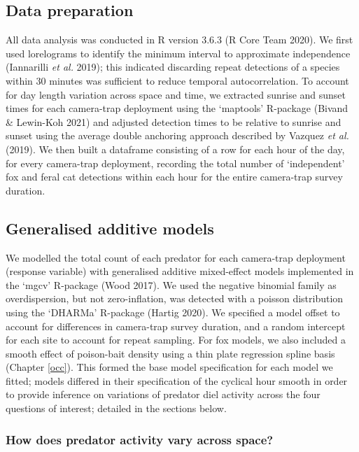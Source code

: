 \documentclass[11pt,a4paper,titlepage,twoside,openright]{style/unimelbthesis}
\begin{document}
\begin{mainmatter}
\hypertarget{data-preparation}{%
\subsection{Data preparation}\label{data-preparation}}

All data analysis was conducted in R version 3.6.3 (R Core Team 2020). We first used lorelograms to identify the minimum interval to approximate independence (Iannarilli \emph{et al.} 2019); this indicated discarding repeat detections of a species within 30 minutes was sufficient to reduce temporal autocorrelation. To account for day length variation across space and time, we extracted sunrise and sunset times for each camera-trap deployment using the `maptools' R-package (Bivand \& Lewin-Koh 2021) and adjusted detection times to be relative to sunrise and sunset using the average double anchoring approach described by Vazquez \emph{et al.} (2019). We then built a dataframe consisting of a row for each hour of the day, for every camera-trap deployment, recording the total number of `independent' fox and feral cat detections within each hour for the entire camera-trap survey duration.

\hypertarget{generalised-additive-models-1}{%
\subsection{Generalised additive models}\label{generalised-additive-models-1}}

We modelled the total count of each predator for each camera-trap deployment (response variable) with generalised additive mixed-effect models implemented in the `mgcv' R-package (Wood 2017). We used the negative binomial family as overdispersion, but not zero-inflation, was detected with a poisson distribution using the `DHARMa' R-package (Hartig 2020). We specified a model offset to account for differences in camera-trap survey duration, and a random intercept for each site to account for repeat sampling. For fox models, we also included a smooth effect of poison-bait density using a thin plate regression spline basis (Chapter \ref{occ}). This formed the base model specification for each model we fitted; models differed in their specification of the cyclical hour smooth in order to provide inference on variations of predator diel activity across the four questions of interest; detailed in the sections below.

\hypertarget{how-does-predator-activity-vary-across-space}{%
\subsubsection{How does predator activity vary across space?}\label{how-does-predator-activity-vary-across-space}}


\end{mainmatter}
\end{document}
